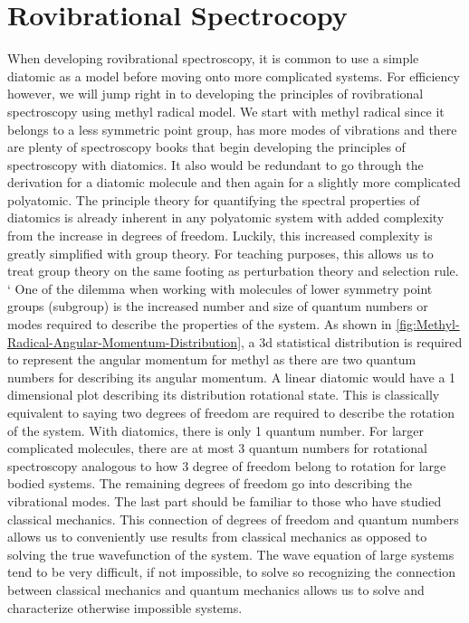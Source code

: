 \documentclass[11pt,a4paper]{book}
\begin{document}
	\section{Rovibrational Spectrocopy}
		\label{sec:Rovibrational Spectrocopy}
		
		When developing rovibrational spectroscopy, it is common to use a simple diatomic as a model before moving onto more complicated systems. For efficiency however, we will jump right in to developing the principles of rovibrational spectroscopy using methyl radical model. We start with methyl radical since it belongs to a less symmetric point group, has more modes of vibrations and there are plenty of spectroscopy books that begin developing the principles of spectroscopy with diatomics. It also would be redundant to go through the derivation for a diatomic molecule and then again for a slightly more complicated polyatomic. The principle theory for quantifying the spectral properties of diatomics is already inherent in any polyatomic system with added complexity from the increase in degrees of freedom. Luckily, this increased complexity is greatly simplified with group theory. For teaching purposes, this allows us to treat group theory on the same footing as perturbation theory and selection rule.
		`
		One of the dilemma when working with molecules of lower symmetry point groups (subgroup) is the increased number and size of quantum numbers or modes required to describe the properties of the system. As shown in \autoref{fig:Methyl-Radical-Angular-Momentum-Distribution}, a 3d statistical distribution is required to represent the angular momentum for methyl as there are two quantum numbers for describing its angular momentum. A linear diatomic would have a 1 dimensional plot describing its distribution rotational state. This is classically equivalent to saying two degrees of freedom are required to describe the rotation of the system. With diatomics, there is only 1 quantum number. For larger complicated molecules, there are at most 3 quantum numbers for rotational spectroscopy analogous to how 3 degree of freedom belong to rotation for large bodied systems. The remaining degrees of freedom go into describing the vibrational modes. The last part should be familiar to those who have studied classical mechanics. This connection of degrees of freedom and quantum numbers allows us to conveniently use results from classical mechanics as opposed to solving the true wavefunction of the system. The wave equation of large systems tend to be very difficult, if not impossible, to solve so recognizing the connection between classical mechanics and quantum mechanics allows us to solve and characterize otherwise impossible systems.
\end{document}
